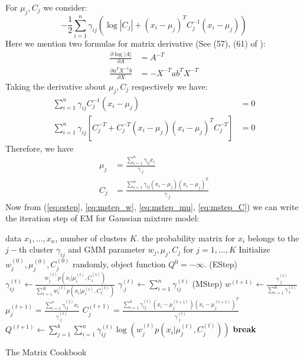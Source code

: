 \documentclass[a4paper, 12pt]{exam}
\begin{document}
	For $\mu_j, C_j$ we consider:
	$$
	-\frac{1}{2}\sum_{i=1}^n \gamma_{ij} (\log |C_j| + (x_i - \mu_j)^TC^{-1}_j(x_i - \mu_j) )
	$$
	Here we mention two formulas for matrix derivative (See (57), (61) of \cite{matrix_cookbook} ):
	\begin{align*}
	\frac{\partial \log |A|}{\partial A} &= A^{-T} \\
	\frac{\partial a^T X^{-1}b}{\partial X} & = -X^{-T} ab^T X^{-T}
	\end{align*}	
	Taking the derivative about $\mu_j, C_j$ respectively we have:
	\begin{align*}
	\sum_{i=1}^n \gamma_{ij} C_j^{-1} (x_i - \mu_j) &= 0\\
	\sum_{i=1}^n \gamma_{ij} [C_j^{-T} + C_j^{-T} (x_i - \mu_j) (x_i - \mu_j)^T C_j^{-T}] &= 0
	\end{align*}
	Therefore, we have
	\begin{align}
	\mu_j &= \frac{\sum_{i=1}^n \gamma_{ij}x_i}{\gamma_{\cdot j}} \label{eq:mstep_mu}\\
	C_j & = \frac{\sum_{i=1}^n \gamma_{ij}(x_i - \mu_j) (x_i - \mu_j)^T}{\gamma_{\cdot j}} \label{eq:mstep_C}
	\end{align}
	Now from (\ref{eq:estep}, \ref{eq:mstep_w}, \ref{eq:mstep_mu}, \ref{eq:mstep_C}) we can write the iteration step of EM for
	Gaussian mixture model:
\begin{algorithm}
	\begin{algorithmic}[1]
	\REQUIRE data $x_1, \dots, x_n$, number of clusters $K$.
	\ENSURE the probability matrix for $x_i$ belongs to the $j-$th cluster $\gamma_{ij}$ and GMM parameter $w_j, \mu_j, C_j$ for
	$j=1,\dots, K$
	\STATE Initialize $w^{(0)}_j, \mu^{(0)}_j, C^{(0)}_j$ randomly, object function $Q^{0} = -\infty$.
	\STATE (EStep) $\gamma_{ij}^{(t)} \leftarrow \frac{w^{(t)}_j p(x_i | \mu^{(t)}_i, C^{(t)}_i)}{\sum_{r=1}^K w^{(t)}_r p(x_i | \mu^{(t)}_r, C^{(t)}_r)}$
	\STATE $\gamma^{(t)}_{\cdot j} \leftarrow \sum_{i=1}^n \gamma^{(t)}_{ij}$
	\STATE (MStep) $w^{(t+1)} \leftarrow \frac{\gamma^{(t)}_{\cdot j} }{\sum_{r=1}^K \gamma^{(t)}_{\cdot r} }$
	\STATE $\mu^{(t+1)}_j = \frac{\sum_{i=1}^n \gamma^{(t)}_{ij}x_i}{\gamma^{(t)}_{\cdot j}}$
	\STATE $ C^{(t+1)}_j =\frac{\sum_{i=1}^n \gamma^{(t)}_{ij}(x_i - \mu^{(t+1)}_j) (x_i - \mu^{(t+1)}_j)^T}{\gamma^{(t)}_{\cdot j}}$
	\ENDFOR
	\STATE $Q^{(t+1)} \leftarrow \sum_{j=1}^k \sum_{i=1}^n \gamma^{(t)}_{ij} \log (w^{(t)}_j p(x_i |\mu^{(t)}_j, C^{(t)}_j))$
	\STATE \textbf{break}
	\ENDIF
	\ENDFOR
\end{algorithmic}
\end{algorithm}	
	\begin{thebibliography}{9}
	 The Matrix Cookbook
\end{thebibliography}
\end{document}
